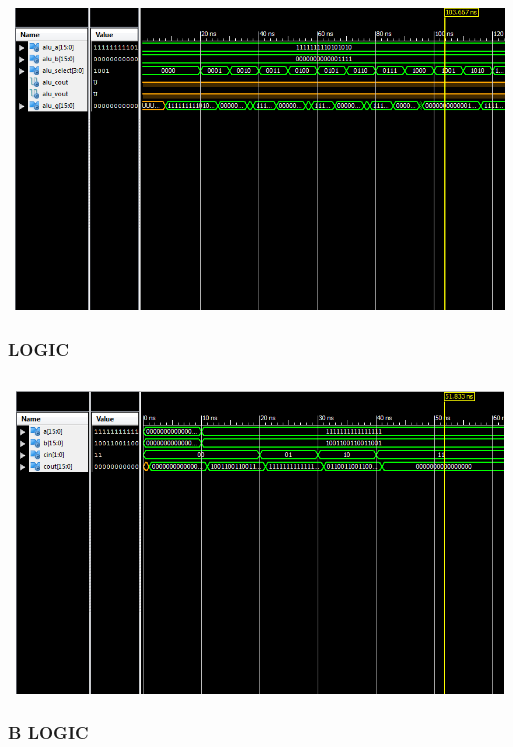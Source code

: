 \documentclass{article}
\begin{document}
\begin{lstlisting}

\end{lstlisting}
\includegraphics[width=16cm, height=8cm]{test_alu.png}
\pagebreak


\subsubsection{LOGIC}\label{sec:result}

\begin{lstlisting}

\end{lstlisting}
\includegraphics[width=16cm, height=8cm]{test_logic.png}
\pagebreak


\subsubsection{B LOGIC}\label{sec:result}
\end{document}
